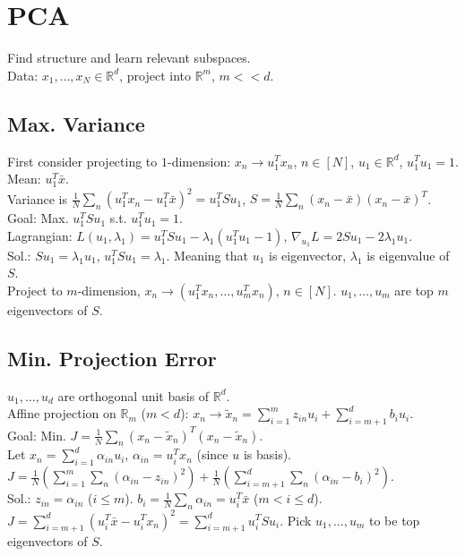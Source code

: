 \section{PCA}

Find structure and learn relevant subspaces.\\
Data: $x_1, \dots, x_N \in \mathbb{R}^d$, project into $\mathbb{R}^m$, $m << d$.

\subsection*{Max. Variance}

First consider projecting to $1$-dimension: $x_n \rightarrow u_1^T x_n$, $n \in [N]$, $u_1 \in \mathbb{R}^d$, $u_1^T u_1 = 1$.\\
Mean: $u_1^T\bar{x}$.\\
Variance is $\frac{1}{N}\sum_n(u_1^T x_n - u_1^T \bar{x})^2 = u_1^T S u_1$, $S = \frac{1}{N}\sum_n (x_n - \bar{x})(x_n - \bar{x})^T$.\\
Goal: Max. $u_1^T S u_1$ s.t. $u_1^T u_1 = 1$.\\
Lagrangian: $L(u_1, \lambda_1) = u_1^T S u_1 - \lambda_1(u_1^T u_1 - 1)$, $\nabla_{u_1}L = 2 S u_1 - 2 \lambda_1 u_1$.\\
Sol.: $S u_1 = \lambda_1 u_1$, $u_1^T S u_1 = \lambda_1$. Meaning that $u_1$ is eigenvector, $\lambda_1$ is eigenvalue of $S$.\\
Project to $m$-dimension, $x_n \rightarrow (u_1^T x_n, \dots, u_m^T x_n)$, $n \in [N]$. $u_1, \dots, u_m$ are top $m$ eigenvectors of $S$.

\subsection*{Min. Projection Error}

$u_1, \dots, u_d$ are orthogonal unit basis of $\mathbb{R}^d$.\\
Affine projection on $\mathbb{R}_m$ ($m < d$): $x_n \rightarrow \tilde{x}_n = \sum_{i=1}^m z_{in}u_i + \sum_{i=m+1}^d b_i u_i$.\\
Goal: Min. $J = \frac{1}{N} \sum_n (x_n - \tilde{x}_n)^T(x_n - \tilde{x}_n)$.\\
Let $x_n = \sum_{i=1}^d \alpha_{in}u_i$, $\alpha_{in} = u_i^T x_n$ (since $u$ is basis). $J = \frac{1}{N}(\sum_{i=1}^m \sum_n (\alpha_{in} - z_{in})^2) + \frac{1}{N}(\sum_{i=m+1}^d \sum_n (\alpha_{in} - b_i)^2)$.\\
Sol.: $z_{in} = \alpha_{in}$ ($i \leq m$). $b_i = \frac{1}{N}\sum_n \alpha_{in} = u_i^T \bar{x}$ ($m < i \leq d$).\\
$J = \sum_{i=m+1}^d(u_i^T \bar{x} - u_i^T x_n)^2 = \sum_{i=m+1}^d u_i^T S u_i$. Pick $u_1, \dots, u_m$ to be top eigenvectors of $S$.

